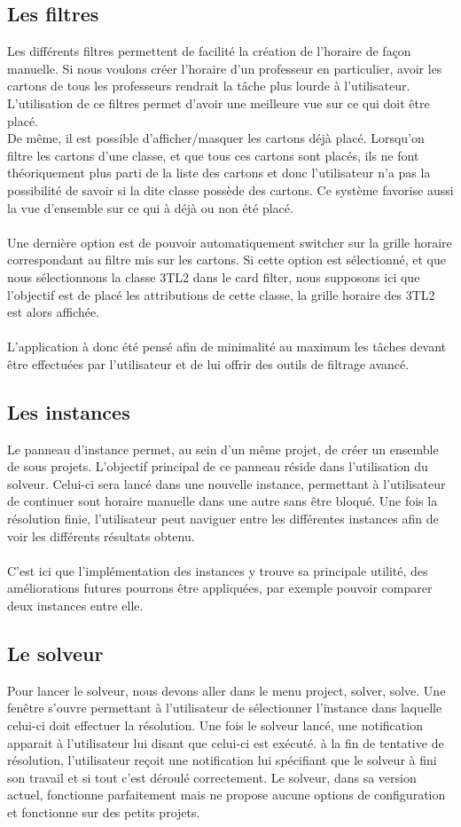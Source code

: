 \subsection{Les filtres}
Les différents filtres permettent de facilité la création de l'horaire de façon manuelle. Si nous voulons créer l'horaire d'un professeur en particulier, avoir les cartons de tous les professeurs rendrait la tâche plus lourde à l'utilisateur. L'utilisation de ce filtres permet d'avoir une meilleure vue sur ce qui doit être placé.\\
De même, il est possible d'afficher/masquer les cartons déjà placé. Lorsqu'on filtre les cartons d'une classe, et que tous ces cartons sont placés, ils ne font théoriquement plus parti de la liste des cartons et donc l'utilisateur n'a pas la possibilité de savoir si la dite classe possède des cartons. Ce système favorise aussi la vue d'ensemble sur ce qui à déjà ou non été placé.\\
\\
Une dernière option est de pouvoir automatiquement switcher sur la grille horaire correspondant au filtre mis sur les cartons. Si cette option est sélectionné, et que nous sélectionnons la classe 3TL2 dans le card filter, nous supposons ici que l'objectif est de placé les attributions de cette classe, la grille horaire des 3TL2 est alors affichée.\\
\\
L'application à donc été pensé afin de minimalité au maximum les tâches devant être effectuées par l'utilisateur et de lui offrir des outils de filtrage avancé.
\subsection{Les instances}
Le panneau d'instance permet, au sein d'un même projet, de créer un ensemble de sous projets. L'objectif principal de ce panneau réside dans l'utilisation du solveur. Celui-ci sera lancé dans une nouvelle instance, permettant à l'utilisateur de continuer sont horaire manuelle dans une autre sans être bloqué. Une fois la résolution finie, l'utilisateur peut naviguer entre les différentes instances afin de voir les différents résultats obtenu. \\
\\
C'est ici que l'implémentation des instances y trouve sa principale utilité, des améliorations futures pourrons être appliquées, par exemple pouvoir comparer deux instances entre elle.
\subsection{Le solveur}
Pour lancer le solveur, nous devons aller dans le menu project, solver, solve. Une fenêtre s'ouvre permettant à l'utilisateur de sélectionner l'instance dans laquelle celui-ci doit effectuer la résolution. Une fois le solveur lancé, une notification apparait à l'utilisateur lui disant que celui-ci est exécuté. à la fin de tentative de résolution, l'utilisateur reçoit une notification lui spécifiant que le solveur à fini son travail et si tout c'est déroulé correctement. Le solveur, dans sa version actuel, fonctionne parfaitement mais ne propose aucune options de configuration et fonctionne sur des petits projets. 

